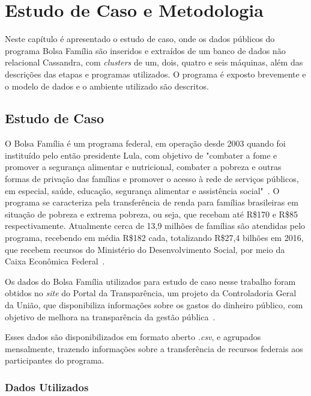 

\chapter{Estudo de Caso e Metodologia}

Neste capítulo é apresentado o estudo de caso, onde os dados públicos do programa Bolsa Família são inseridos e extraídos de um banco de dados não relacional Cassandra, com \emph{clusters} de um, dois, quatro e seis máquinas, além das descrições das etapas e programas utilizados. O programa é exposto brevemente e o modelo de dados e o ambiente utilizado são descritos.

\section{Estudo de Caso}
O Bolsa Família é um programa federal, em operação desde 2003 quando foi instituído pelo então presidente Lula, com objetivo de "combater a fome e promover a segurança alimentar e nutricional, combater a pobreza e outras formas de privação das famílias e promover o acesso à rede de serviços públicos, em especial, saúde, educação, segurança alimentar e assistência social"~\cite{caixa-bolsafamilia}. 
O programa se caracteriza pela transferência de renda para famílias brasileiras em situação de pobreza e extrema pobreza, ou seja, que recebam até R\$170 e R\$85 respectivamente. Atualmente cerca de 13,9 milhões de famílias são atendidas pelo programa, recebendo em média R\$182 cada, totalizando R\$27,4 bilhões em 2016, que recebem recursos do Ministério do Desenvolvimento Social, por meio da Caixa Econômica Federal~\cite{gov-bolsafamilia1, gov-bolsafamilia2}.

Os dados do Bolsa Família utilizados para estudo de caso nesse trabalho foram obtidos no \emph{site} do Portal da Transparência, um projeto da Controladoria Geral da União, que disponibiliza informações sobre os gastos do dinheiro público, com objetivo de melhora na transparência da gestão pública~\cite{sobreportaldatransparencia}. 

Esses dados são disponibilizados em formato aberto \emph{.csv}, e agrupados mensalmente, trazendo informações sobre a transferência de recursos federais aos participantes do programa. 

\subsection{Dados Utilizados}

